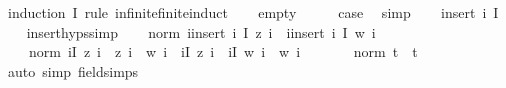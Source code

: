 \begin{isabellebody}
%
\isadelimproof
%
\endisadelimproof
%
\isatagproof
{}\isamarkupfalse%
\ {\isacharparenleft}{\kern0pt}induction\ I\ rule{\isacharcolon}{\kern0pt}\ infinite{\isacharunderscore}{\kern0pt}finite{\isacharunderscore}{\kern0pt}induct{\isacharparenright}{\kern0pt}\isanewline
\ \ \isamarkupfalse%
\ empty\isanewline
\ \ \isamarkupfalse%
\ \isamarkupfalse%
\ {\isacharquery}{\kern0pt}case\ \isamarkupfalse%
\ simp\isanewline
{}\isamarkupfalse%
\isanewline
\ \ \isamarkupfalse%
\ {\isacharparenleft}{\kern0pt}insert\ i\ I{\isacharparenright}{\kern0pt}\isanewline
\ \ \isamarkupfalse%
\ insert{\isachardot}{\kern0pt}hyps{\isacharbrackleft}{\kern0pt}simp{\isacharbrackright}{\kern0pt}\isanewline
\isanewline
\ \ \isamarkupfalse%
\ {\isachardoublequoteopen}norm\ {\isacharparenleft}{\kern0pt}{\isacharparenleft}{\kern0pt}{\isasymProd}i{\isasymin}insert\ i\ I{\isachardot}{\kern0pt}\ z\ i{\isacharparenright}{\kern0pt}\ {\isacharminus}{\kern0pt}\ {\isacharparenleft}{\kern0pt}{\isasymProd}i{\isasymin}insert\ i\ I{\isachardot}{\kern0pt}\ w\ i{\isacharparenright}{\kern0pt}{\isacharparenright}{\kern0pt}\ {\isacharequal}{\kern0pt}\isanewline
\ \ \ \ norm\ {\isacharparenleft}{\kern0pt}{\isacharparenleft}{\kern0pt}{\isasymProd}i{\isasymin}I{\isachardot}{\kern0pt}\ z\ i{\isacharparenright}{\kern0pt}\ {\isacharasterisk}{\kern0pt}\ {\isacharparenleft}{\kern0pt}z\ i\ {\isacharminus}{\kern0pt}\ w\ i{\isacharparenright}{\kern0pt}\ {\isacharplus}{\kern0pt}\ {\isacharparenleft}{\kern0pt}{\isacharparenleft}{\kern0pt}{\isasymProd}i{\isasymin}I{\isachardot}{\kern0pt}\ z\ i{\isacharparenright}{\kern0pt}\ {\isacharminus}{\kern0pt}\ {\isacharparenleft}{\kern0pt}{\isasymProd}i{\isasymin}I{\isachardot}{\kern0pt}\ w\ i{\isacharparenright}{\kern0pt}{\isacharparenright}{\kern0pt}\ {\isacharasterisk}{\kern0pt}\ w\ i{\isacharparenright}{\kern0pt}{\isachardoublequoteclose}\isanewline
\ \ \ \ {\isacharparenleft}{\kern0pt}\ {\isachardoublequoteopen}{\isacharunderscore}{\kern0pt}\ {\isacharequal}{\kern0pt}\ norm\ {\isacharparenleft}{\kern0pt}{\isacharquery}{\kern0pt}t{}\ {\isacharplus}{\kern0pt}\ {\isacharquery}{\kern0pt}t{}{\isacharparenright}{\kern0pt}{\isachardoublequoteclose}{\isacharparenright}{\kern0pt}\isanewline
\ \ \ \ \isamarkupfalse%
\ {\isacharparenleft}{\kern0pt}auto\ simp{\isacharcolon}{\kern0pt}\ field{\isacharunderscore}{\kern0pt}simps{\isacharparenright}{\kern0pt}\isanewline
\ \ \isamarkupfalse%

\end{isabellebody}
